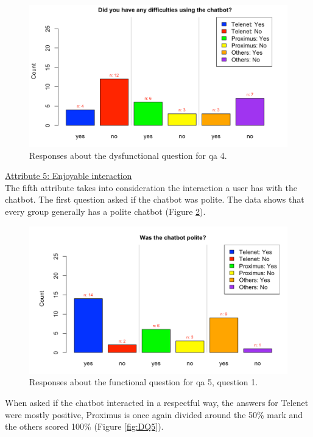 \begin{figure}[!htb]
	\includegraphics[width=\linewidth, scale=0.5]{../LaTeX/Figures/Comparative/DQ4.png}
	\caption{Responses about the dysfunctional question for \acrshort{qa} 4.}\label{fig:DQ4}
\end{figure}
\break
\ul{Attribute 5: Enjoyable interaction}\\
\break
The fifth attribute takes into consideration the interaction a user has with the chatbot. The first question asked if the chatbot was polite. The data shows that every group generally has a polite chatbot (Figure \ref{fig:Q5}).\\
\begin{figure}[!htb]
	\includegraphics[width=\linewidth, scale=0.5]{../LaTeX/Figures/Comparative/Q5.png}
	\caption{Responses about the functional question for \acrshort{qa} 5, question 1.}\label{fig:Q5}
\end{figure}
\break
When asked if the chatbot interacted in a respectful way, the answers for Telenet were mostly positive, Proximus is once again divided around the 50\% mark and the others scored 100\% (Figure \ref{fig:DQ5}).\\
